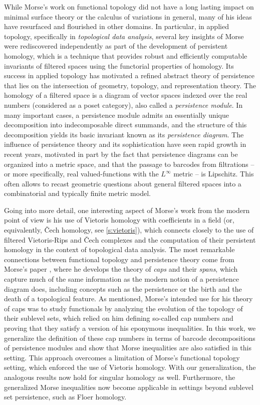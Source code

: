 While Morse's work on functional topology did not have a long lasting impact on minimal surface theory or the calculus of variations in general, many of his ideas have resurfaced and flourished in other domains.
In particular, in applied topology, specifically in \emph{topological data analysis}, several key insights of Morse were rediscovered independently as part of the development of persistent homology, which is
a technique that provides robust and efficiently computable invariants of filtered spaces using the functorial properties of homology.
Its success in applied topology has motivated a refined abstract theory of persistence that lies on the intersection of geometry, topology, and representation theory.
The homology of a filtered space is a diagram of vector spaces indexed over the real numbers (considered as a poset category), also called a \emph{persistence module}.
In many important cases, a persistence module admits an essentially unique decomposition into indecomposable direct summands, and the structure of this decomposition yields its basic invariant known as its \emph{persistence diagram}.
The influence of persistence theory and its sophistication have seen rapid growth in recent years, motivated in part by the fact that persistence diagrams can be organized into a metric space, and that the passage to barcodes from filtrations -- or more specifically, real valued-functions with the $L^\infty$ metric -- is Lipschitz.
This often allows to recast geometric questions about general filtered spaces into a combinatorial and typically finite metric model.

Going into more detail, one interesting aspect of Morse's work from the modern point of view is his use of Vietoris homology with coefficients in a field (or, equivalently, \v{C}ech homology, see \cref{s:vietoris}), which connects closely to the use of filtered Vietoris-Rips and \v{C}ech complexes and the computation of their persistent homology in the context of topological data analysis.
The most remarkable connections between functional topology and persistence theory come from Morse's paper \cite{Morse.1940}, where he develops the theory of \emph{caps} and their \emph{spans}, which capture much of the same information as the modern notion of a persistence diagram does, including concepts such as the persistence or the birth and the death of a topological feature.
As mentioned, Morse's intended use for his theory of caps was to study functionals by analyzing the evolution of the topology of their sublevel sets, which relied on him defining so-called cap numbers and proving that they satisfy a version of his eponymous inequalities.
In this work, we generalize the definition of these cap numbers in terms of barcode decompositions of persistence modules and show that Morse inequalities are also satisfied in this setting.
This approach overcomes a limitation of Morse's functional topology setting, which enforced the use of Vietoris homology.
With our generalization, the analogous results now hold for singular homology as well.
Furthermore, the generalized Morse inequalities now become applicable in settings beyond sublevel set persistence, such as Floer homology.

